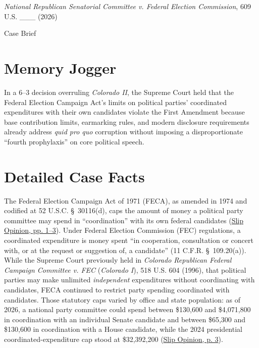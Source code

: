 \documentclass[12pt]{article}
\begin{document}
\begin{center}
{\LARGE \textit{National Republican Senatorial Committee v. Federal Election Commission}, 609 U.S. \_\_\_ (2026)\par}
\vspace{0.8em}
{\large Case Brief\par}
\end{center}
\vspace{1em}

\section{Memory Jogger}
In a 6--3 decision overruling \textit{Colorado II}, the Supreme Court held that the Federal Election Campaign Act's limits on political parties' coordinated expenditures with their own candidates violate the First Amendment because base contribution limits, earmarking rules, and modern disclosure requirements already address \textit{quid pro quo} corruption without imposing a disproportionate ``fourth prophylaxis'' on core political speech.

\section{Detailed Case Facts}
The Federal Election Campaign Act of 1971 (FECA), as amended in 1974 and codified at 52 U.S.C. \S~30116(d), caps the amount of money a political party committee may spend in ``coordination'' with its own federal candidates (\href{https://www.supremecourt.gov/opinions/25pdf/24-621_h315.pdf}{Slip Opinion, pp. 1--3}). Under Federal Election Commission (FEC) regulations, a coordinated expenditure is money spent ``in cooperation, consultation or concert with, or at the request or suggestion of, a candidate'' (11 C.F.R. \S~109.20(a)). While the Supreme Court previously held in \textit{Colorado Republican Federal Campaign Committee v. FEC} (\textit{Colorado I}), 518 U.S. 604 (1996), that political parties may make unlimited \textit{independent} expenditures without coordinating with candidates, FECA continued to restrict party spending coordinated with candidates. Those statutory caps varied by office and state population: as of 2026, a national party committee could spend between \$130,600 and \$4,071,800 in coordination with an individual Senate candidate and between \$65,300 and \$130,600 in coordination with a House candidate, while the 2024 presidential coordinated-expenditure cap stood at \$32,392,200 (\href{https://www.supremecourt.gov/opinions/25pdf/24-621_h315.pdf}{Slip Opinion, p. 3}).
\end{document}
